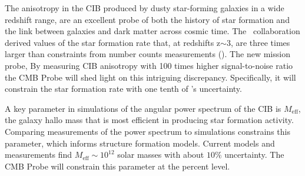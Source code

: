 
The anisotropy in the \ac{CIB} produced by dusty star-forming galaxies in a wide redshift range, are
an excellent probe of both the history of star formation and the link between
galaxies and dark matter across cosmic time. The \planck\ collaboration 
derived values of the star formation rate that,
at redshifts z$\mathrm{\sim3}$, are three times larger 
than constraints from number counts measurements (\cite{planck2014-XXX,planckXVIII,madau2014}).
The new mission probe, 
By measuring \ac{CIB} anisotropy with 100 times higher signal-to-noise ratio
the CMB Probe will shed light on this intriguing discrepancy. 
Specifically, it will constrain the star formation rate with one tenth of \planck 's uncertainty. 


A key parameter in simulations of the angular power spectrum of the \ac{CIB} 
is $M_{\mathrm{eff}}$, the galaxy hallo mass that is most efficient in producing star 
formation activity. Comparing measurements of the power spectrum to simulations
constrains this parameter, which informs structure formation models. Current models and measurements 
find $M_{\mathrm{eff}}\sim 10^{12}$ solar masses with about $\mathrm{10\%}$ uncertainty. 
The CMB Probe will constrain this parameter at the percent level.



